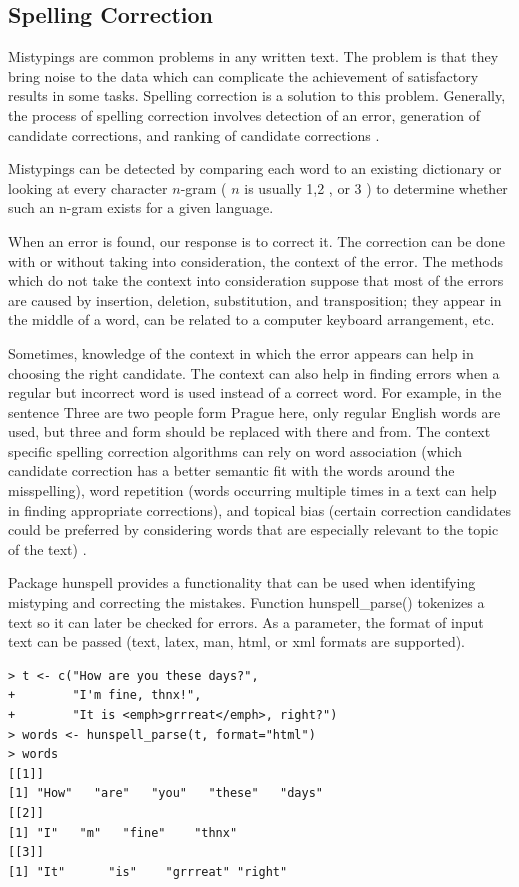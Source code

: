 \documentclass[11pt,openany,executivepaper]{book}
\begin{document}
\subsection{Spelling Correction}
Mistypings are common problems in any written text. The problem is that they bring noise to the data which can complicate the achievement of satisfactory results in some tasks. Spelling correction is a solution to this problem. Generally, the process of spelling correction involves detection of an error, generation of candidate corrections, and ranking of candidate corrections \cite{155}.

Mistypings can be detected by comparing each word to an existing dictionary or looking at every character $n$-gram ( $n$ is usually 1,2 , or 3 ) to determine whether such an n-gram exists for a given language.

When an error is found, our response is to correct it. The correction can be done with or without taking into consideration, the context of the error. The methods which do not take the context into consideration suppose that most of the errors are caused by insertion, deletion, substitution, and transposition; they appear in the middle of a word, can be related to a computer keyboard arrangement, etc.

Sometimes, knowledge of the context in which the error appears can help in choosing the right candidate. The context can also help in finding errors when a regular but incorrect word is used instead of a correct word. For example, in the sentence Three are two people form Prague here, only regular English words are used, but three and form should be replaced with there and from. The context specific spelling correction algorithms can rely on word association (which candidate correction has a better semantic fit with the words around the misspelling), word repetition (words occurring multiple times in a text can help in finding appropriate corrections), and topical bias (certain correction candidates could be preferred by considering words that are especially relevant to the topic of the text) \cite{90}.

Package hunspell provides a functionality that can be used when identifying mistyping and correcting the mistakes. Function hunspell\_parse() tokenizes a text so it can later be checked for errors. As a parameter, the format of input text can be passed (text, latex, man, html, or xml formats are supported).

\begin{verbatim}
> t <- c("How are you these days?",
+        "I'm fine, thnx!",
+        "It is <emph>grrreat</emph>, right?")
> words <- hunspell_parse(t, format="html")
> words
[[1]]
[1] "How"   "are"   "you"   "these"   "days"
[[2]]
[1] "I"   "m"   "fine"    "thnx"
[[3]]
[1] "It"      "is"    "grrreat" "right"
\end{verbatim}
\end{document}
